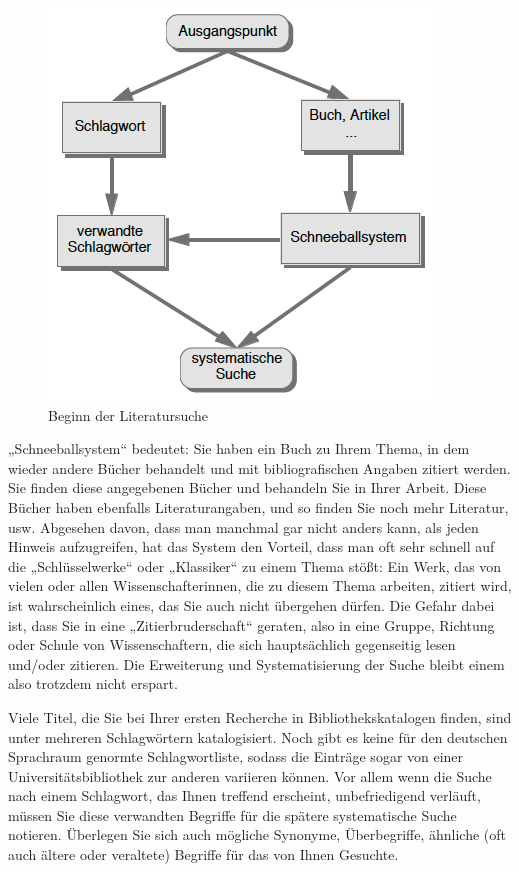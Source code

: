 \documentclass[]{book}
\theoremstyle{definition}
\theoremstyle{definition}
\theoremstyle{definition}
\theoremstyle{remark}
\begin{document}
\begin{figure}

{\centering \includegraphics{images/recherchieren-literatursuche-beginn-min} 

}

\caption{Beginn der Literatursuche}\label{fig:unnamed-chunk-5}
\end{figure}

„Schneeballsystem`` bedeutet: Sie haben ein Buch zu Ihrem Thema, in dem
wieder andere Bücher behandelt und mit bibliografischen Angaben zitiert
werden. Sie finden diese angegebenen Bücher und behandeln Sie in Ihrer
Arbeit. Diese Bücher haben ebenfalls Literaturangaben, und so finden Sie
noch mehr Literatur, usw. Abgesehen davon, dass man manchmal gar nicht
anders kann, als jeden Hinweis aufzugreifen, hat das System den Vorteil,
dass man oft sehr schnell auf die „Schlüsselwerke`` oder „Klassiker`` zu
einem Thema stößt: Ein Werk, das von vielen oder allen
Wissenschafterinnen, die zu diesem Thema arbeiten, zitiert wird, ist
wahrscheinlich eines, das Sie auch nicht übergehen dürfen. Die Gefahr
dabei ist, dass Sie in eine „Zitierbruderschaft`` geraten, also in eine
Gruppe, Richtung oder Schule von Wissenschaftern, die sich hauptsächlich
gegenseitig lesen und/oder zitieren. Die Erweiterung und
Systematisierung der Suche bleibt einem also trotzdem nicht erspart.

Viele Titel, die Sie bei Ihrer ersten Recherche in Bibliothekskatalogen
finden, sind unter mehreren Schlagwörtern katalogisiert. Noch gibt es
keine für den deutschen Sprachraum genormte Schlagwortliste, sodass die
Einträge sogar von einer Universitätsbibliothek zur anderen variieren
können. Vor allem wenn die Suche nach einem Schlagwort, das Ihnen
treffend erscheint, unbefriedigend verläuft, müssen Sie diese verwandten
Begriffe für die spätere systematische Suche notieren. Überlegen Sie
sich auch mögliche Synonyme, Überbegriffe, ähnliche (oft auch ältere
oder veraltete) Begriffe für das von Ihnen Gesuchte.
\end{document}
